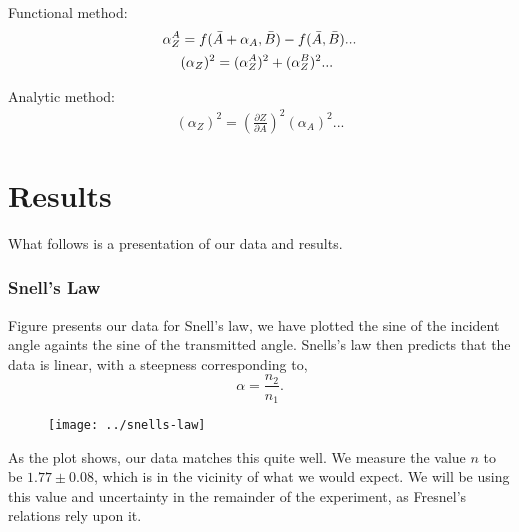 \documentclass[working]{inputs/tuftebook}
\begin{document}
 Functional method:
 \begin{align*}
     \alpha^A_Z & =f(\Bar{A}+\alpha_A,\Bar{B})-f(\Bar{A},\Bar{B}) ...\\
     &  (\alpha_Z)^2 = (\alpha^A_Z)^2 + (\alpha^B_Z)^2 ...
 \end{align*}
 
 Analytic method:
 \begin{align*}
     (\alpha_Z)^2=(\frac{\partial Z}{\partial A})^2(\alpha_A)^2 ...
 \end{align*}
\section*{Results}
What follows is a presentation of our data and results.
\subsubsection{Snell's Law}
Figure presents our data for Snell's law, we have plotted the sine of the incident angle againts the sine of the transmitted angle. Snells's law then predicts that the data is linear, with a steepness corresponding to,
\[
	\alpha = \frac{n_2}{n_1}
.\] 
\begin{figure}[h]
	\texttt{[image: ../snells-law]}
	\label{fig:}
\end{figure}
As the plot shows, our data matches this quite well. We measure the value $n$ to be $1.77 \pm 0.08$, which is in the vicinity of what we would expect. We will be using this value and uncertainty in the remainder of the experiment, as Fresnel's relations rely upon it.
\end{document}
